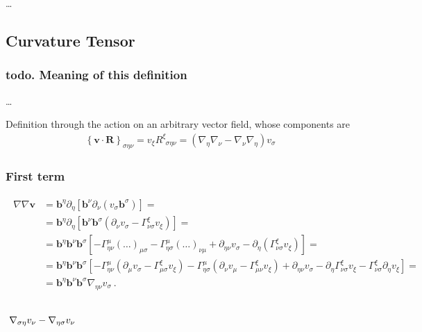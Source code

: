 \documentclass[letterpaper,10pt,english]{jupyterBook}
\begin{document}
\sphinxAtStartPar
…


\subsection{Curvature Tensor}
\label{\detokenize{ch/relativity-general/differential-geometry:curvature-tensor}}\label{\detokenize{ch/relativity-general/differential-geometry:relativity-general-notes-differential-geometry-curvature-tensor}}\subsubsection*{todo. Meaning of this definition}

\sphinxAtStartPar
…

\sphinxAtStartPar
Definition through the action on an arbitrary vector field, whose components are
\begin{equation*}
\begin{split}\left\{ \mathbf{v} \cdot \mathbf{R} \right\}_{\sigma \eta \nu} = v_{\xi} R^{\xi}_{\ \ \sigma \eta \nu} = \left( \nabla_{\eta} \nabla_{\nu} - \nabla_{\nu} \nabla_{\eta} \right) v_{\sigma}\end{split}
\end{equation*}\subsubsection*{First term}
\begin{equation*}
\begin{split}\begin{aligned}
  \nabla \nabla \mathbf{v} 
  & = \mathbf{b}^{\eta} \partial_{\eta} \left[ \mathbf{b}^{\nu} \partial_{\nu} \left( v_{\sigma} \mathbf{b}^{\sigma} \right) \right] = \\
  & = \mathbf{b}^{\eta} \partial_{\eta} \left[ \mathbf{b}^{\nu} \mathbf{b}^{\sigma} \left( \partial_{\nu} v_{\sigma} - \Gamma_{\nu \sigma}^{\xi} v_{\xi}  \right) \right] = \\
  & = \mathbf{b}^{\eta} \mathbf{b}^{\nu} \mathbf{b}^{\sigma} \left[ - \Gamma_{\eta \nu}^{\mu} (\dots)_{\mu \sigma} - \Gamma_{\eta \sigma}^{\mu} (\dots)_{\nu \mu} + \partial_{\eta \nu} v_{\sigma} - \partial_{\eta} \left( \Gamma_{\nu \sigma}^{\xi} v_{\xi} \right) \right] = \\
  & = \mathbf{b}^{\eta} \mathbf{b}^{\nu} \mathbf{b}^{\sigma} \left[
    - \Gamma_{\eta  \nu}^{\mu} \left( \partial_{\mu} v_{\sigma} - \Gamma_{\mu \sigma}^{\xi} v_{\xi} \right)
    - \Gamma_{\eta \sigma}^{\mu} \left( \partial_{\nu} v_{\mu} - \Gamma_{\mu \nu}^{\xi} v_{\xi} \right)
    + \partial_{\eta \nu} v_{\sigma} - \partial_{\eta} \Gamma_{\nu \sigma}^{\xi} v_{\xi} - \Gamma_{\nu \sigma}^{\xi} \partial_{\eta} v_{\xi} \right] = \\
  & =  \mathbf{b}^{\eta} \mathbf{b}^{\nu} \mathbf{b}^{\sigma} \nabla_{\eta \nu} v_{\sigma} \ .
\end{aligned}\end{split}
\end{equation*}\subsubsection*{\protect\(\ \nabla_{\sigma \eta} v_{\nu} - \nabla_{\eta \sigma} v_{\nu} \ \protect\)}
\end{document}
